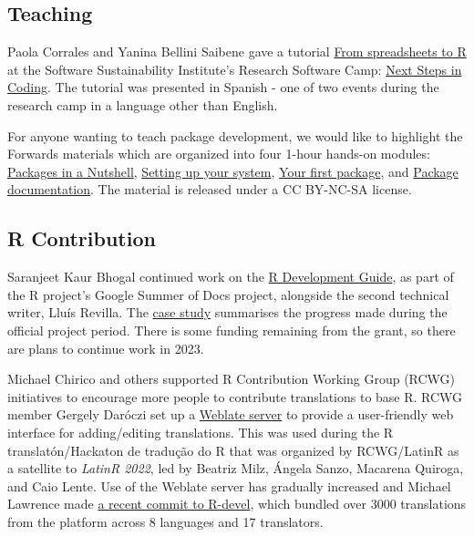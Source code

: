 \hypertarget{teaching}{%
\subsection{Teaching}\label{teaching}}

Paola Corrales and Yanina Bellini Saibene gave a tutorial \href{https://yabellini.netlify.app/courses/deplanillasdecalculoar/}{From spreadsheets to R} at the Software Sustainability Institute's Research Software Camp: \href{https://www.software.ac.uk/blog/2022-05-04-what-attend-research-software-camp-next-steps-coding}{Next Steps in Coding}. The tutorial was presented in Spanish - one of two events during the research camp in a language other than English.

For anyone wanting to teach package development, we would like to highlight the Forwards materials which are organized into four 1-hour hands-on modules: \href{https://forwards.github.io/workshops/package-dev-modules/slides/01-packages-in-a-nutshell/packages-in-a-nutshell.html\#1}{Packages in a Nutshell}, \href{https://forwards.github.io/workshops/package-dev-modules/slides/02-setting-up-system/setting-up-system.html\#1}{Setting up your system}, \href{https://forwards.github.io/workshops/package-dev-modules/slides/03-your-first-package/your-first-package.html\#1}{Your first package}, and \href{https://forwards.github.io/workshops/package-dev-modules/slides/04-package-documentation/package-documentation.html\#1}{Package documentation}. The material is released under a CC BY-NC-SA license.

\hypertarget{r-contribution}{%
\subsection{R Contribution}\label{r-contribution}}

Saranjeet Kaur Bhogal continued work on the \href{https://contributor.r-project.org/rdevguide/}{R Development Guide}, as part of the R project's Google Summer of Docs project, alongside the second technical writer, Lluís Revilla. The \href{https://github.com/rstats-gsod/gsod2022/wiki/GSOD-2022-Case-Study}{case study} summarises the progress made during the official project period. There is some funding remaining from the grant, so there are plans to continue work in 2023.

Michael Chirico and others supported R Contribution Working Group (RCWG) initiatives to encourage more people to contribute translations to base R. RCWG member Gergely Daróczi set up a \href{https://translate.rx.studio}{Weblate server} to provide a user-friendly web interface for adding/editing translations. This was used during the R translatón/Hackaton de tradução do R that was organized by RCWG/LatinR as a satellite to \emph{LatinR 2022}, led by Beatriz Milz, Ángela Sanzo, Macarena Quiroga, and Caio Lente. Use of the Weblate server has gradually increased and Michael Lawrence made \href{https://github.com/r-devel/r-svn/commit/dd4ed6ffc9b620c7b4a92f8cb9dab9ecc8b5890c}{a recent commit to R-devel}, which bundled over 3000 translations from the platform across 8 languages and 17 translators.

